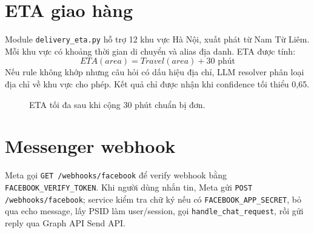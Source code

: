 \documentclass[10pt,a4paper,twocolumn]{article}
\begin{document}
\section{ETA giao hàng}
Module \texttt{delivery\_eta.py} hỗ trợ 12 khu vực Hà Nội, xuất phát từ Nam Từ Liêm. Mỗi khu vực có khoảng thời gian di chuyển và alias địa danh. ETA được tính:
\begin{equation}
  ETA(area)=Travel(area)+30\text{ phút}
\end{equation}
Nếu rule không khớp nhưng câu hỏi có dấu hiệu địa chỉ, LLM resolver phân loại địa chỉ về khu vực cho phép. Kết quả chỉ được nhận khi confidence tối thiểu 0,65.

\begin{figure}[H]
\centering
{}
\caption{ETA tối đa sau khi cộng 30 phút chuẩn bị đơn.}
\label{fig:eta}
\end{figure}

\section{Messenger webhook}
Meta gọi \texttt{GET /webhooks/facebook} để verify webhook bằng \texttt{FACEBOOK\_VERIFY\_TOKEN}. Khi người dùng nhắn tin, Meta gửi \texttt{POST /webhooks/facebook}; service kiểm tra chữ ký nếu có \texttt{FACEBOOK\_APP\_SECRET}, bỏ qua echo message, lấy PSID làm user/session, gọi \texttt{handle\_chat\_request}, rồi gửi reply qua Graph API Send API.
\end{document}
